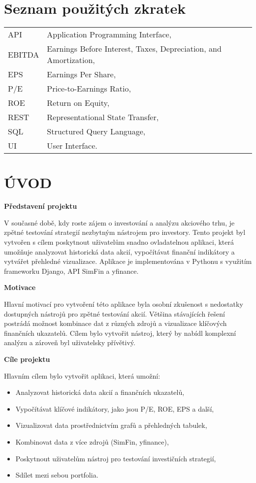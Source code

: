 \documentclass[12pt, a4paper]{report}
\begin{document}
\chapter*{Seznam použitých zkratek}
\begin{tabular}{ll}
API & Application Programming Interface,\\
EBITDA & Earnings Before Interest, Taxes, Depreciation, and Amortization,\\
EPS & Earnings Per Share,\\
P/E & Price-to-Earnings Ratio,\\
ROE & Return on Equity,\\
REST & Representational State Transfer,\\
SQL & Structured Query Language,\\
UI & User Interface.\\
\end{tabular}

\newcommand{\introsubheading}[1]{%
  {\noindent\textbf{\normalsize #1}\vspace{1pt}\par}%
}

\chapter*{ÚVOD}

\introsubheading{Představení projektu}
V současné době, kdy roste zájem o investování a analýzu akciového trhu, je zpětné testování strategií nezbytným nástrojem pro investory. Tento projekt byl vytvořen s cílem poskytnout uživatelům snadno ovladatelnou aplikaci, která umožňuje analyzovat historická data akcií, vypočítávat finanční indikátory a vytvářet přehledné vizualizace. Aplikace je implementována v Pythonu s využitím frameworku Django, API SimFin a yfinance.

\introsubheading{Motivace}
Hlavní motivací pro vytvoření této aplikace byla osobní zkušenost s nedostatky dostupných nástrojů pro zpětné testování akcií. Většina stávajících řešení postrádá možnost kombinace dat z různých zdrojů a vizualizace klíčových finančních ukazatelů. Cílem bylo vytvořit nástroj, který by nabídl komplexní analýzu a zároveň byl uživatelsky přívětivý.

\introsubheading{Cíle projektu}
Hlavním cílem bylo vytvořit aplikaci, která umožní:
\begin{itemize}
    \item Analyzovat historická data akcií a finančních ukazatelů,
    \item Vypočítávat klíčové indikátory, jako jsou P/E, ROE, EPS a další,
    \item Vizualizovat data prostřednictvím grafů a přehledných tabulek,
    \item Kombinovat data z více zdrojů (SimFin, yfinance),
    \item Poskytnout uživatelům nástroj pro testování investičních strategií,
    \item Sdílet mezi sebou portfolia.
\end{itemize}
\end{document}
